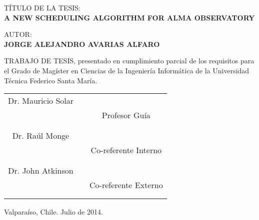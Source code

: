\thispagestyle{empty}
\vspace*{\fill}

T\'ITULO DE LA TESIS:\\
\textbf{A NEW SCHEDULING ALGORITHM FOR ALMA OBSERVATORY}
\vspace{2cm}

AUTOR:\\
\textbf{JORGE ALEJANDRO AVARIAS ALFARO}
\vspace{2cm}

TRABAJO DE TESIS, presentado en cumplimiento parcial de los requisitos para el Grado de Mag\'ister en Ciencias de la  Ingenier\'ia Inform\'atica de la Universidad T\'ecnica Federico Santa Mar\'ia.

\vspace{3cm}

\begin{tabular}{ccc}
Dr. Mauricio Solar & \hspace{2cm} & \hspace{7cm} \\ \cline{3-3}
 & & Profesor Gu\'ia \\
 & & \\
 & & \\
Dr. Ra\'ul Monge & \hspace{2cm} & \hspace{7cm} \\ \cline{3-3}
 & & Co-referente Interno \\
 & & \\
 & & \\
Dr. John Atkinson & \hspace{2cm} & \hspace{7cm} \\ \cline{3-3}
 & & Co-referente Externo \\
 & & \\
 & & \\
\end{tabular}

\vfill
\hfill Valparaíso, Chile. Julio de 2014.
\cleardoublepage